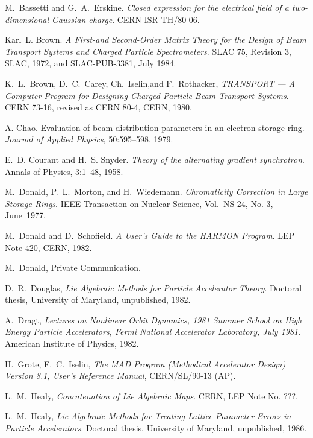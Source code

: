 \begin{thebibliography}{99}
 
 M.~Bassetti and G.~A.~Erskine.  {\it Closed expression
for the electrical field of a two-dimensional Gaussian charge}.
CERN-ISR-TH/80-06.
 
 Karl~L. Brown.  {\it A First-and Second-Order Matrix
Theory for the Design of Beam Transport Systems and Charged Particle
Spectrometers}.  SLAC 75, Revision 3, SLAC, 1972, and SLAC-PUB-3381,
July 1984.
 
 K.~L.~Brown, D.~C.~Carey, Ch.~Iselin,and
F.~Rothacker, {\it TRANSPORT --- A Computer Program for Designing
  Charged Particle Beam Transport Systems}.  CERN 73-16, revised as
CERN 80-4, CERN, 1980.
 
 A. Chao.  Evaluation of beam distribution parameters
in an electron storage ring.  {\it Journal of Applied Physics},
50:595--598, 1979.
 
 E.~D. Courant and H.~S. Snyder.  {\it Theory of the
alternating gradient synchrotron}.  Annals of Physics, 3:1--48, 1958.
 
 M.~Donald, P.~L.~Morton, and H.~Wiedemann.
{\it Chromaticity Correction in Large Storage Rings}.
IEEE Transaction on Nuclear Science, Vol.~NS-24, No. 3, June~1977.
 
 M.~Donald and D.~Schofield.
{\it A User's Guide to the HARMON Program}.
LEP Note 420, CERN, 1982.
 
 M.~Donald, Private Communication.
 
 D.~R.~Douglas, {\it Lie Algebraic Methods for Particle
Accelerator Theory}.  Doctoral thesis, University of Maryland,
unpublished, 1982.
 
 A.~Dragt, {\it Lectures on Nonlinear Orbit Dynamics,
1981 Summer School on High Energy Particle Accelerators, Fermi
National Accelerator Laboratory, July 1981}.  American Institute of
Physics, 1982.
 
 H.~Grote, F.~C.~Iselin, {\it The MAD Program
(Methodical Accelerator Design) Version 8.1, User's Reference Manual},
CERN/SL/90-13 (AP).
 
 L.~M.~Healy, {\it Concatenation of Lie Algebraic
Maps}.  CERN, LEP Note No. ???.
 
 L.~M.~Healy, {\it Lie Algebraic Methods for Treating
Lattice Parameter Errors in Particle Accelerators}.  Doctoral thesis,
University of Maryland, unpublished, 1986.
 

\end{thebibliography}
